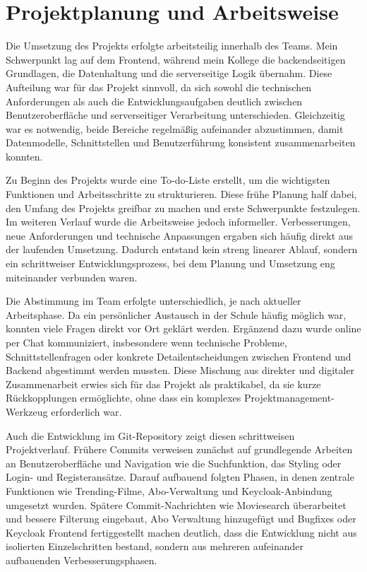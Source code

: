 \section{Projektplanung und Arbeitsweise}
Die Umsetzung des Projekts erfolgte arbeitsteilig innerhalb des Teams. Mein Schwerpunkt lag auf dem Frontend, während mein Kollege die backendseitigen Grundlagen, die Datenhaltung und die serverseitige Logik übernahm. Diese Aufteilung war für das Projekt sinnvoll, da sich sowohl die technischen Anforderungen als auch die Entwicklungsaufgaben deutlich zwischen Benutzeroberfläche und serverseitiger Verarbeitung unterschieden. Gleichzeitig war es notwendig, beide Bereiche regelmäßig aufeinander abzustimmen, damit Datenmodelle, Schnittstellen und Benutzerführung konsistent zusammenarbeiten konnten.

Zu Beginn des Projekts wurde eine To-do-Liste erstellt, um die wichtigsten Funktionen und Arbeitsschritte zu strukturieren. Diese frühe Planung half dabei, den Umfang des Projekts greifbar zu machen und erste Schwerpunkte festzulegen. Im weiteren Verlauf wurde die Arbeitsweise jedoch informeller. Verbesserungen, neue Anforderungen und technische Anpassungen ergaben sich häufig direkt aus der laufenden Umsetzung. Dadurch entstand kein streng linearer Ablauf, sondern ein schrittweiser Entwicklungsprozess, bei dem Planung und Umsetzung eng miteinander verbunden waren.

Die Abstimmung im Team erfolgte unterschiedlich, je nach aktueller Arbeitsphase. Da ein persönlicher Austausch in der Schule häufig möglich war, konnten viele Fragen direkt vor Ort geklärt werden. Ergänzend dazu wurde online per Chat kommuniziert, insbesondere wenn technische Probleme, Schnittstellenfragen oder konkrete Detailentscheidungen zwischen Frontend und Backend abgestimmt werden mussten. Diese Mischung aus direkter und digitaler Zusammenarbeit erwies sich für das Projekt als praktikabel, da sie kurze Rückkopplungen ermöglichte, ohne dass ein komplexes Projektmanagement-Werkzeug erforderlich war.

Auch die Entwicklung im Git-Repository zeigt diesen schrittweisen Projektverlauf. Frühere Commits verweisen zunächst auf grundlegende Arbeiten an Benutzeroberfläche und Navigation wie die Suchfunktion, das Styling oder Login- und Registeransätze. Darauf aufbauend folgten Phasen, in denen zentrale Funktionen wie Trending-Filme, Abo-Verwaltung und Keycloak-Anbindung umgesetzt wurden. Spätere Commit-Nachrichten wie \glqq Moviesearch überarbeitet und bessere Filterung eingebaut\grqq{}, \glqq Abo Verwaltung hinzugefügt und Bugfixes\grqq{} oder \glqq Keycloak Frontend fertiggestellt\grqq{} machen deutlich, dass die Entwicklung nicht aus isolierten Einzelschritten bestand, sondern aus mehreren aufeinander aufbauenden Verbesserungsphasen.

